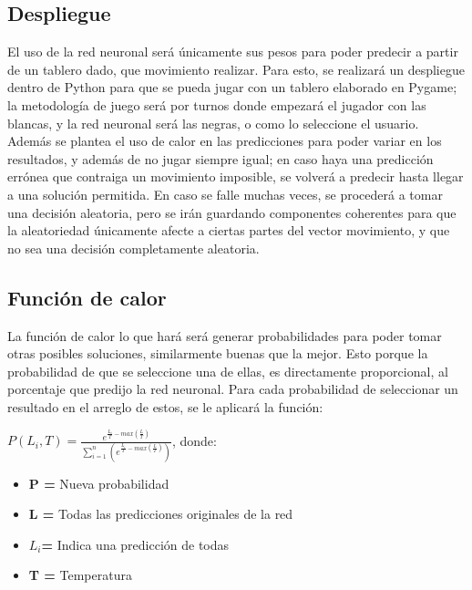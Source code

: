 \subsection{Despliegue}
El uso de la red neuronal será únicamente sus pesos para poder predecir a partir de un tablero dado, que movimiento realizar. Para esto, se realizará un despliegue dentro de Python para que se pueda jugar con un tablero elaborado en Pygame; la metodología de juego será por turnos donde empezará el jugador con las blancas, y la red neuronal será las negras, o como lo seleccione el usuario.\newline
Además se plantea el uso de calor en las predicciones para poder variar en los resultados, y además de no jugar siempre igual; en caso haya una predicción errónea que contraiga un movimiento imposible, se volverá a predecir hasta llegar a una solución permitida. En caso se falle muchas veces, se procederá a tomar una decisión aleatoria, pero se irán guardando componentes coherentes para que la aleatoriedad únicamente afecte a ciertas partes del vector movimiento, y que no sea una decisión completamente aleatoria.

\subsection{Función de calor}

La función de calor lo que hará será generar probabilidades para poder tomar otras posibles soluciones, similarmente buenas que la mejor. Esto porque la probabilidad de que se seleccione una de ellas, es directamente proporcional, al porcentaje que predijo la red neuronal. Para cada probabilidad de seleccionar un resultado en el arreglo de estos, se le aplicará la función:

$P(L_i,T) = \frac{e^{\frac{L_i}{T} - max(\frac{L}{T})}}{\sum_{i=1}^{n} (e ^{ \frac{L_i}{T} - max( \frac{L}{T}) })}$, donde:

\begin{itemize}
    \item \textbf{P = } Nueva probabilidad
    \item \textbf{L = } Todas las predicciones originales de la red
    \item \textbf{$L_i$= } Indica una predicción de todas
    \item \textbf{T = } Temperatura
\end{itemize}

